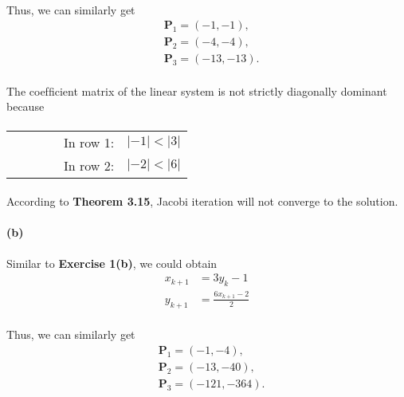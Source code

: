 \documentclass{article}  %
\begin{document}
        \paragraph{}Thus, we can similarly get
        \begin{align*}
            &\bm{P}_1 = (-1, -1),  \\
            &\bm{P}_2 = (-4, -4),  \\
            &\bm{P}_3 = (-13, -13‬).
        \end{align*}
        \paragraph{}The coefﬁcient matrix of the linear system is not strictly diagonally dominant because
        \paragraph{}
        \renewcommand\tabcolsep{12.0pt} %
        \begin{threeparttable} %
            \begin{tabular}{cccccc} 
             & & & & In row 1: & $|-1| < |3|$ \\
             & & & & In row 2: & $|-2| < |6|$
            \end{tabular} 
        \end{threeparttable}
        \paragraph{}According to \textbf{Theorem 3.15}, Jacobi iteration will not converge to the solution.
        \paragraph{(b)}Similar to \textbf{Exercise 1(b)}, we could obtain 
        \begin{align*}
            x_{k+1} &= 3y_k - 1 \\
            y_{k+1} &= \frac{6x_{k+1} - 2}{2}
        \end{align*}
        \paragraph{}Thus, we can similarly get
        \begin{align*}
            &\bm{P}_1 = (-1, -4),  \\
            &\bm{P}_2 = (-13, -40),  \\
            &\bm{P}_3 = (-121, -364‬).
        \end{align*}
\end{document}
